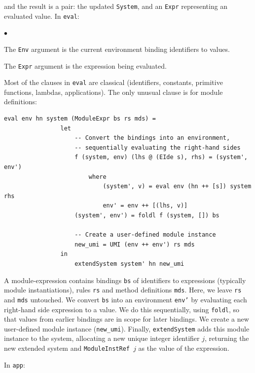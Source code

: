\documentclass[11pt]{article}
\newenvironment{tightlist}%
{\begin{list}{$\bullet$}{%
    \setlength{\topsep}{0in}
    \setlength{\partopsep}{0in}
    \setlength{\itemsep}{0in}
    \setlength{\parsep}{0in}
    \setlength{\leftmargin}{1.5em}
    \setlength{\rightmargin}{0in}
    \setlength{\itemindent}{0in}
}
}%
{\end{list}
}
\newcommand{\term}[1]{\texttt{#1}}
\begin{document}
and the result is a pair: the updated \term{System}, and an
\term{Expr} representing an evaluated value.  In \term{eval}:
\begin{tightlist}

\item The \term{Env} argument is the current environment binding identifiers to values.

\item The \term{Expr} argument is the expression being evaluated.

\end{tightlist}

Most of the clauses in \term{eval} are classical (identifiers,
constants, primitive functions, lambdas, applications).  The only
unusual clause is for module definitions:

\begin{Verbatim}[frame=single, commandchars=\\\{\}]
eval env hn system (ModuleExpr bs rs mds) =
                let
                    -- Convert the bindings into an environment,
                    -- sequentially evaluating the right-hand sides
                    f (system, env) (lhs @ (EIde s), rhs) = (system', env')
                        where
                            (system', v) = eval env (hn ++ [s]) system rhs
                            env' = env ++ [(lhs, v)]
                    (system', env') = foldl f (system, []) bs

                    -- Create a user-defined module instance
                    new_umi = UMI (env ++ env') rs mds
                in
                    extendSystem system' hn new_umi
\end{Verbatim}

A module-expression contains bindings \term{bs} of identifiers to
expressions (typically module instantiations), rules \term{rs} and
method definitions \term{mds}.  Here, we leave \term{rs} and
\term{mds} untouched.  We convert \term{bs} into an environment
\term{env'} by evaluating each right-hand side expression to a value.
We do this sequentially, using \term{foldl}, so that values from
earlier bindings are in scope for later bindings.  We create a new
user-defined module instance (\term{new\_umi}).  Finally,
\term{extendSystem} adds this module instance to the system,
allocating a new unique integer identifier $j$, returning the new
extended system and \term{ModuleInstRef~$j$} as the value of the
expression.

In \term{app}:
\end{document}
